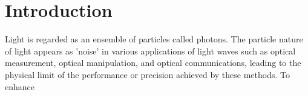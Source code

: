 \chapter{Introduction}

Light is regarded as an ensemble of particles called photons. The particle nature of light appears as 'noise' in various applications of light waves such as optical measurement, optical manipulation, and optical communications, leading to the physical limit of the performance or precision achieved by these methods. To enhance 








